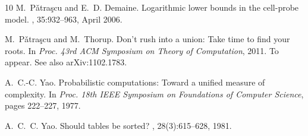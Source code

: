 \documentclass[letterpaper]{article}
\begin{document}
\begin{thebibliography}{10}
M.~P{\v a}tra{\c s}cu and E.~D. Demaine.
\newblock Logarithmic lower bounds in the cell-probe model.
, 35:932--963, April 2006.

M.~P{\v a}tra{\c s}cu and M.~Thorup.
\newblock Don't rush into a union: Take time to find your roots.
\newblock In {\em Proc. 43rd ACM Symposium on Theory of Computation}, 2011.
\newblock To appear. See also arXiv:1102.1783.

A.~C.-C. Yao.
\newblock Probabilistic computations: Toward a unified measure of complexity.
\newblock In {\em Proc. 18th IEEE Symposium on Foundations of Computer
  Science}, pages 222--227, 1977.

A.~C.~C. Yao.
\newblock Should tables be sorted?
, 28(3):615--628, 1981.

\end{thebibliography}
\end{document}
